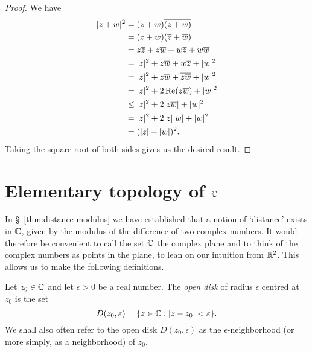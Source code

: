 \begin{proof}
    We have
    \[
        \begin{aligned}
            |z + w|^2 &= (z + w)\overline{(z + w)} \\
            &= (z + w)(\overline{z} + \overline{w}) \\
            &= z\overline{z} + z\overline{w} + w\overline{z} + w\overline{w} \\
            &= |z|^2 + z\overline{w} + w\overline{z} + |w|^2 \\
            &= |z|^2 + z\overline{w} + \overline{z\overline{w}} + |w|^2 \\
            &= |z|^2 + 2\operatorname{Re}(z\overline{w}) + |w|^2 \\
            &\leq |z|^2 + 2|z\overline{w}| + |w|^2 \\
            &= |z|^2 + 2|z||w| + |w|^2 \\
            &= (|z| + |w|)^2.
        \end{aligned}
    \]
    Taking the square root of both sides gives us the desired result.
\end{proof}

\begin{corollary}
    \label{cor:triangle-inequality}
    
\end{corollary}

\section{Elementary topology of \(\mathbb{C}\)}

In \S~\ref{thm:distance-modulus} we have established that a notion of `distance' exists in \(\mathbb{C}\), given by the modulus of the difference of two complex numbers. It would therefore be convenient to call the set \(\mathbb{C}\) the complex plane and to think of the complex numbers as points in the plane, to lean on our intuition from \(\mathbb{R}^2\). This allows us to make the following definitions.

\begin{definition}
    Let \(z_0 \in \mathbb{C}\) and let \(\epsilon > 0\) be a real number. The \emph{open disk} of radius \(\epsilon\) centred at \(z_0\) is the set
    \[
        D(z_0, \varepsilon) = \{z \in \mathbb{C} : |z - z_0| < \varepsilon\}.
    \]
    We shall also often refer to the open disk \(D(z_0, \epsilon)\) as the \(\epsilon\)-neighborhood (or more simply, as a neighborhood) of \(z_0\).
    \label{def:open-disk}
\end{definition}

